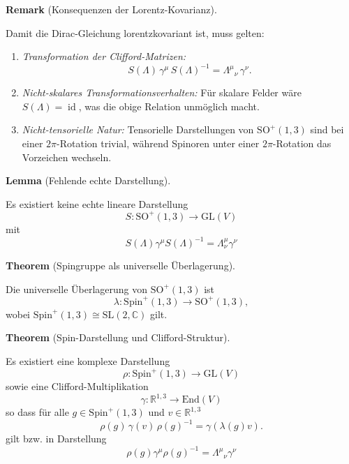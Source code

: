 \documentclass[10pt, letterpaper]{article}
\newcommand{\id}{\operatorname{id}}
\newcommand{\End}{\mathrm{End}}
\newcommand{\GL}{\mathrm{GL}}
\newcommand{\SL}{\mathrm{SL}}
\newcommand{\SO}{\mathrm{SO}}
\newcommand{\Spin}{\mathrm{Spin}}
\newcommand{\CustomHeading}[3]{%
  \par\medskip\noindent%
  \textbf{#1 #2} \textnormal{(#3)}.\enskip%
}
\newenvironment{THEO}[2]{\CustomHeading{Theorem}{#1}{#2}}{}
\newenvironment{LEM}[2]{\CustomHeading{Lemma}{#1}{#2}}{}
\newenvironment{REM}[2]{\CustomHeading{Remark}{#1}{#2}}{}
\begin{document}
\begin{REM}{}{Konsequenzen der Lorentz-Kovarianz}
Damit die Dirac-Gleichung lorentzkovariant ist, muss gelten:
\begin{enumerate}
\item \emph{Transformation der Clifford-Matrizen:}
\[
S(\Lambda)\,\gamma^\mu\,S(\Lambda)^{-1}
= \Lambda^\mu{}_\nu\,\gamma^\nu.
\]

\item \emph{Nicht-skalares Transformationsverhalten:}
Für skalare Felder wäre $S(\Lambda)=\id$, was die obige Relation unmöglich macht.

\item \emph{Nicht-tensorielle Natur:}
Tensorielle Darstellungen von $\SO^{+}(1,3)$ sind bei einer $2\pi$-Rotation trivial,
während Spinoren unter einer $2\pi$-Rotation das Vorzeichen wechseln.
\end{enumerate}
\end{REM}

\begin{LEM}{}{Fehlende echte Darstellung}
Es existiert keine echte lineare Darstellung
\[
S:\SO^{+}(1,3)\to\GL(V)
\]
mit
$$S(\Lambda) \gamma^\mu S(\Lambda)^{-1}=\Lambda_\nu^\mu \gamma^\nu$$
\end{LEM}

\begin{THEO}{}{Spingruppe als universelle Überlagerung}
Die universelle Überlagerung von $\SO^{+}(1,3)$ ist
\[
\lambda:\Spin^{+}(1,3)\to\SO^{+}(1,3),
\]
wobei $\Spin^{+}(1,3)\cong \SL(2,\mathbb{C})$ gilt.
\end{THEO}

\begin{THEO}{}{Spin-Darstellung und Clifford-Struktur}
Es existiert eine komplexe Darstellung
\[
\rho:\Spin^{+}(1,3)\to\GL(V)
\]
sowie eine Clifford-Multiplikation
\[
\gamma:\mathbb{R}^{1,3}\to\End(V)
\]
so dass für alle $g\in\Spin^{+}(1,3)$ und $v\in\mathbb{R}^{1,3}$
\[
\rho(g)\,\gamma(v)\,\rho(g)^{-1}
= \gamma(\lambda(g)v).
\]
gilt bzw. in Darstellung
$$\rho(g) \gamma^\mu \rho(g)^{-1}=\Lambda^\mu{ }_\nu \gamma^\nu$$
\end{THEO}
\end{document}
